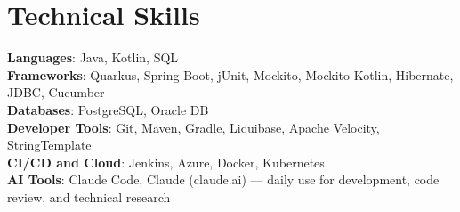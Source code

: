 \documentclass[letterpaper,11pt]{article}
\makeatletter
\newcommand{\resumeSubheading}[4]{
    \vspace{-2pt}\item
    \begin{tabular*}{0.97\textwidth}[t]{l@{\extracolsep{\fill}}r}
    \textbf{#1} & #2 \\
    \textit{\small#3} & \textit{\small #4} \\
    \end{tabular*}\vspace{-7pt}
}
\newcommand{\resumeSubHeadingListStart}{\begin{itemize}[leftmargin=0.15in, label={}]}
\newcommand{\resumeSubHeadingListEnd}{\end{itemize}}
\makeatother
\begin{document}

    \section{Technical Skills}
    \begin{itemize}[leftmargin=0.15in, label={}]
    \small{\item{
        \textbf{Languages}{: Java, Kotlin, SQL} \\
        \textbf{Frameworks}{: Quarkus, Spring Boot, jUnit, Mockito, Mockito Kotlin, Hibernate, JDBC, Cucumber} \\
        \textbf{Databases}{: PostgreSQL, Oracle DB} \\
        \textbf{Developer Tools}{: Git, Maven, Gradle, Liquibase, Apache Velocity, StringTemplate} \\
        \textbf{CI/CD and Cloud}{: Jenkins, Azure, Docker, Kubernetes}\\
        \textbf{AI Tools}{: Claude Code, Claude (claude.ai) --- daily use for development, code review, and technical research}\\
    }}
    \end{itemize}
\end{document}
